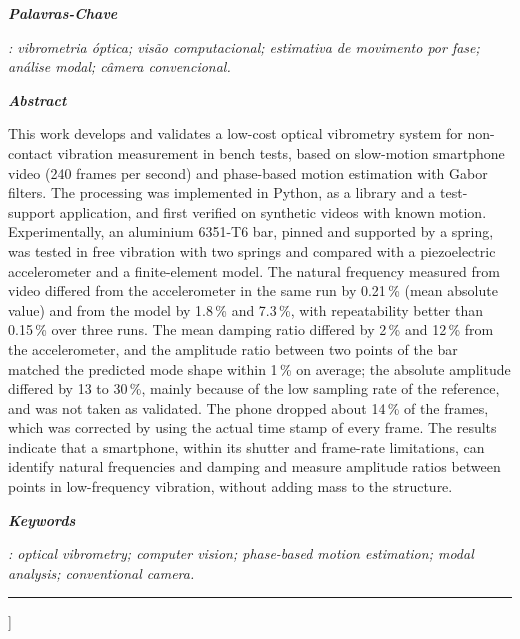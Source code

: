 \documentclass[a4paper,10pt,twocolumn]{article}
\begin{document}
\begin{@twocolumnfalse}
  \vspace{0.6em}
  {\noindent\bfseries\itshape Palavras-Chave}{\itshape: vibrometria óptica;
  visão computacional; estimativa de movimento por fase;
  análise modal; câmera convencional.\par}

  \vspace{0.8em}
  {\noindent\bfseries\itshape Abstract}
  \par\vspace{0.3em}
  {\small\justifying\noindent
  This work develops and validates a low-cost optical vibrometry system for non-contact vibration measurement in bench tests, based on slow-motion smartphone video (240 frames per second) and phase-based motion estimation with Gabor filters. The processing was implemented in Python, as a library and a test-support application, and first verified on synthetic videos with known motion. Experimentally, an aluminium 6351-T6 bar, pinned and supported by a spring, was tested in free vibration with two springs and compared with a piezoelectric accelerometer and a finite-element model. The natural frequency measured from video differed from the accelerometer in the same run by 0.21\,\% (mean absolute value) and from the model by 1.8\,\% and 7.3\,\%, with repeatability better than 0.15\,\% over three runs. The mean damping ratio differed by 2\,\% and 12\,\% from the accelerometer, and the amplitude ratio between two points of the bar matched the predicted mode shape within 1\,\% on average; the absolute amplitude differed by 13 to 30\,\%, mainly because of the low sampling rate of the reference, and was not taken as validated. The phone dropped about 14\,\% of the frames, which was corrected by using the actual time stamp of every frame. The results indicate that a smartphone, within its shutter and frame-rate limitations, can identify natural frequencies and damping and measure amplitude ratios between points in low-frequency vibration, without adding mass to the structure.\par}

  \vspace{0.6em}
  {\noindent\bfseries\itshape Keywords}{\itshape: optical vibrometry; computer
  vision; phase-based motion estimation; modal analysis; conventional camera.\par}

  \vspace{1.2em}
  \hrule
  \vspace{1.2em}
  \end{@twocolumnfalse}
]
\end{document}
